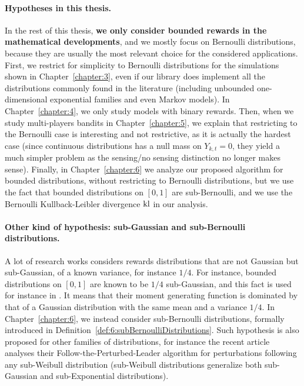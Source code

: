 \paragraph{Hypotheses in this thesis.}
%
In the rest of this thesis, \textbf{we only consider bounded rewards in the mathematical developments}, and we mostly focus on Bernoulli distributions, because they are usually the most relevant choice for the considered applications.
First, we restrict for simplicity to Bernoulli distributions for the simulations shown in Chapter~\ref{chapter:3}, even if our library does implement all the distributions commonly found in the literature (including unbounded one-dimensional exponential families and even Markov models).
In Chapter~\ref{chapter:4}, we only study models with binary rewards.
%
Then, when we study multi-players bandits in Chapter~\ref{chapter:5}, we explain that restricting to the Bernoulli case is interesting and not restrictive, as it is actually the hardest case (since continuous distributions has a null mass on $Y_{k,t}=0$, they yield a much simpler problem as the sensing/no sensing distinction no longer makes sense).
%
Finally, in Chapter~\ref{chapter:6} we analyze our proposed algorithm for bounded distributions, without restricting to Bernoulli distributions, but we use the fact that bounded distributions on $[0,1]$ are sub-Bernoulli, and we use the Bernoulli Kullback-Leibler divergence $\mathrm{kl}$ in our analysis.


\paragraph{Other kind of hypothesis: sub-Gaussian and sub-Bernoulli distributions.}
%
A lot of research works considers rewards distributions that are not Gaussian but sub-Gaussian, of a known variance, for instance $1/4$.
For instance, bounded distributions on $[0,1]$ are known to be $1/4$ sub-Gaussian, and this fact is used for instance in \cite{Maillard2018GLR}.
It means that their moment generating function is dominated by that of a Gaussian distribution with the same mean and a variance $1/4$.
In Chapter~\ref{chapter:6}, we instead consider sub-Bernoulli distributions, formally introduced in Definition~\ref{def:6:subBernoulliDistributions}.
%
Such hypothesis is also proposed for other families of distributions, for instance the recent article \cite{KimTewari2019} analyses their Follow-the-Perturbed-Leader algorithm for perturbations following any sub-Weibull distribution (sub-Weibull distributions generalize both sub-Gaussian and sub-Exponential distributions).



